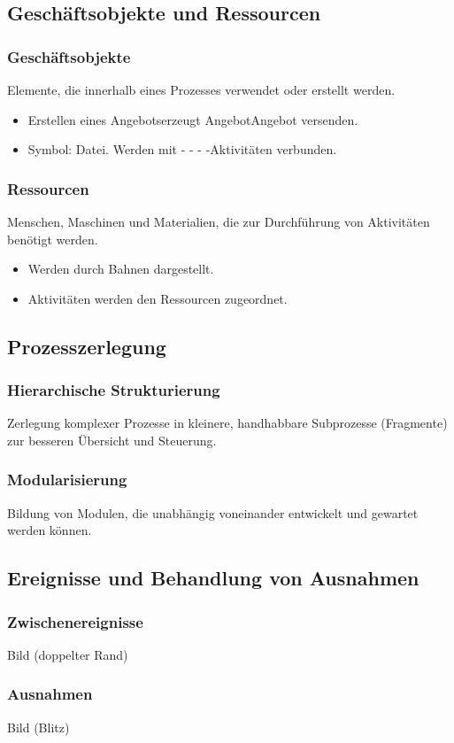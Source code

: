 \subsection{Geschäftsobjekte und Ressourcen}
    \subsubsection*{Geschäftsobjekte}
        Elemente, die innerhalb eines Prozesses verwendet oder erstellt werden. 
        \begin{itemize}
            \item Erstellen eines Angebots\textrightarrow erzeugt Angebot\textrightarrow Angebot versenden. 
            \item Symbol: Datei. Werden mit - - - -\textrightarrow Aktivitäten verbunden.
        \end{itemize}
    \subsubsection*{Ressourcen}
        Menschen, Maschinen und Materialien, die zur Durchführung von Aktivitäten benötigt werden. 
        \begin{itemize}
            \item Werden durch Bahnen dargestellt.
            \item Aktivitäten werden den Ressourcen zugeordnet.
        \end{itemize}

\subsection{Prozesszerlegung}
    \subsubsection*{Hierarchische Strukturierung}
        Zerlegung komplexer Prozesse in kleinere, handhabbare Subprozesse (Fragmente) zur besseren Übersicht und Steuerung.
    \subsubsection*{Modularisierung}
        Bildung von Modulen, die unabhängig voneinander entwickelt und gewartet werden können.

\subsection{Ereignisse und Behandlung von Ausnahmen}
    \subsubsection*{Zwischenereignisse}
        Bild (doppelter Rand)
    \subsubsection*{Ausnahmen}
        Bild (Blitz)